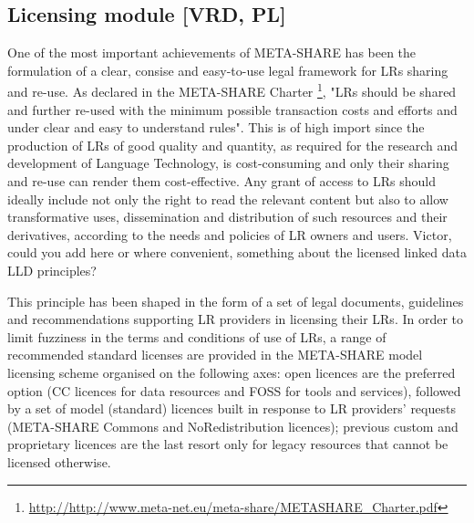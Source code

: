 \documentclass{llncs}
\begin{document}
{\subsection{Licensing module [VRD, PL]}
\label{sec:licensing}

One of the most important achievements of META-SHARE has been the formulation of a clear, consise and easy-to-use legal framework for LRs sharing and re-use. As declared in the META-SHARE Charter \footnote{\url{http://http://www.meta-net.eu/meta-share/METASHARE\_Charter.pdf}}, "LRs should be shared and further re-used with the minimum possible transaction costs and efforts and under clear and easy to understand rules". This is of high import since the production of LRs of good quality and quantity, as required for the research and development of Language Technology, is cost-consuming and only their sharing and re-use can render them cost-effective. Any grant of access to LRs should ideally include not only the right to read the relevant content but also to allow transformative uses, dissemination and distribution of such resources and their derivatives, according to the needs and policies of LR owners and users. 
{Victor, could you add here or where convenient, something about the licensed linked data LLD principles?}

This principle has been shaped in the form of a set of legal documents, guidelines and recommendations supporting LR providers in licensing their LRs. In order to limit fuzziness in the terms and conditions of use of LRs, a range of recommended standard licenses are provided in the META-SHARE model licensing scheme organised on the following axes: open licences are the preferred option (CC licences for data resources and FOSS for tools and services), followed by a set of model (standard) licences built in response to LR providers' requests (META-SHARE Commons and NoRedistribution licences); previous custom and proprietary licences are the last resort only for legacy resources that cannot be licensed otherwise. 

}
\end{document}
